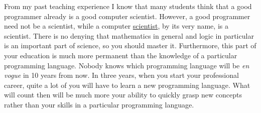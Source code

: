 
From my past teaching experience I know that many students think that a good programmer already is a
good computer scientist.  However, a good programmer need not be a scientist, while a 
{\color{blue}computer \underline{scientist}}, by its very name, is a
{\color{blue}scientist}.  There is no denying that {\color{blue}mathematics} in general and 
{\color{blue}logic} in particular is an important part of science, so you should master it.  Furthermore, this
part of your education is much more permanent than the knowledge of a particular programming
language.  Nobody knows which programming language will be \emph{en vogue} in 10 years from now.  In three
years, when you start your professional career, quite a lot of you will have to learn a new
programming language.  What will count then will be much more your ability to quickly grasp new
concepts rather than your skills in a particular programming language.

